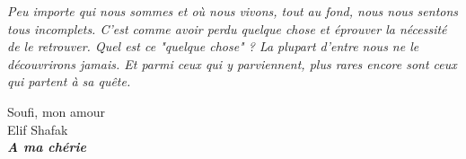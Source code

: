 \thispagestyle{empty}



\vspace*{\fill} \epigraph{\itshape Peu importe qui nous sommes et où nous vivons, tout au fond, nous nous sentons tous incomplets. C'est comme avoir perdu quelque chose et éprouver la nécessité de le retrouver. Quel est ce "quelque chose" ? La plupart d'entre nous ne le découvrirons jamais. Et parmi ceux qui y parviennent, plus rares encore sont ceux qui partent à sa quête.}{Soufi, mon amour \\ Elif Shafak \\ \itshape \textbf{A ma chérie}}
\vfill\clearpage
